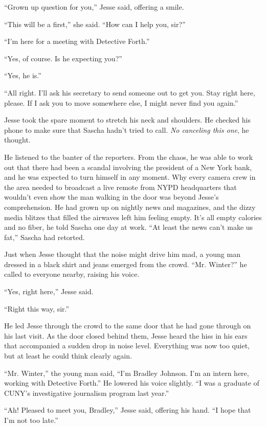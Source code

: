 \documentclass[12pt]{book}
\begin{document}
``Grown up question for you,'' Jesse said, offering a smile.

``This will be a first,'' she said.  ``How can I help you, sir?''

``I'm here for a meeting with Detective Forth.''

``Yes, of course.  Is he expecting you?''

``Yes, he is.''

``All right.  I'll ask his secretary to send someone out to get you.  Stay right here, please.  If I ask you to move somewhere else, I might never find you again.''

Jesse took the spare moment to stretch his neck and shoulders.  He checked his phone to make sure that Sascha hadn't tried to call.  \emph{No canceling this one}, he thought.

He listened to the banter of the reporters.  From the chaos, he was able to work out that there had been a scandal involving the president of a New York bank, and he was expected to turn himself in any moment.  Why every camera crew in the area needed to broadcast a live remote from NYPD headquarters that wouldn't even show the man walking in the door was beyond Jesse's comprehension.  He had grown up on nightly news and magazines, and the dizzy media blitzes that filled the airwaves left him feeling empty.  It's all empty calories and no fiber, he told Sascha one day at work.  ``At least the news can't make us fat,'' Sascha had retorted.

Just when Jesse thought that the noise might drive him mad, a young man dressed in a black shirt and jeans emerged from the crowd.  ``Mr. Winter?'' he called to everyone nearby, raising his voice.

``Yes, right here,'' Jesse said.

``Right this way, sir.''

He led Jesse through the crowd to the same door that he had gone through on his last visit.  As the door closed behind them, Jesse heard the hiss in his ears that accompanied a sudden drop in noise level.  Everything was now too quiet, but at least he could think clearly again.

``Mr. Winter,'' the young man said, ``I'm Bradley Johnson.  I'm an intern here, working with Detective Forth.''  He lowered his voice slightly.  ``I was a graduate of CUNY's investigative journalism program last year.''

``Ah!  Pleased to meet you, Bradley,'' Jesse said, offering his hand.  ``I hope that I'm not too late.''
\end{document}
